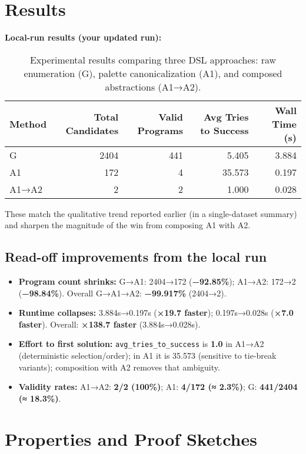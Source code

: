 \documentclass[11pt]{article}
\newcommand{\code}[1]{\texttt{#1}}
\begin{document}
\section{Results}

\textbf{Local-run results (your updated run):}

\begin{table}[h]
\centering
\begin{tabular}{@{}lrrrr@{}}
\toprule
\textbf{Method} & \textbf{Total Candidates} & \textbf{Valid Programs} & \textbf{Avg Tries to Success} & \textbf{Wall Time (s)} \\
\midrule
G & 2404 & 441 & 5.405 & 3.884 \\
A1 & 172 & 4 & 35.573 & 0.197 \\
A1→A2 & 2 & 2 & 1.000 & 0.028 \\
\bottomrule
\end{tabular}
\caption{Experimental results comparing three DSL approaches: raw enumeration (G), palette canonicalization (A1), and composed abstractions (A1→A2).}
\label{tab:results}
\end{table}

These match the qualitative trend reported earlier (in a single-dataset summary) and sharpen the magnitude of the win from composing A1 with A2.

\subsection{Read-off improvements from the local run}

\begin{itemize}
\item \textbf{Program count shrinks:} G→A1: 2404→172 (\textbf{−92.85\%}); A1→A2: 172→2 (\textbf{−98.84\%}). Overall G→A1→A2: \textbf{−99.917\%} (2404→2).
\item \textbf{Runtime collapses:} 3.884s→0.197s (\textbf{×19.7 faster}); 0.197s→0.028s (\textbf{×7.0 faster}). Overall: \textbf{×138.7 faster} (3.884s→0.028s).
\item \textbf{Effort to first solution:} \code{avg\_tries\_to\_success} is \textbf{1.0} in A1→A2 (deterministic selection/order); in A1 it is 35.573 (sensitive to tie-break variants); composition with A2 removes that ambiguity.
\item \textbf{Validity rates:} A1→A2: \textbf{2/2 (100\%)}; A1: \textbf{4/172 (≈ 2.3\%)}; G: \textbf{441/2404 (≈ 18.3\%)}.
\end{itemize}

\section{Properties and Proof Sketches}
\end{document}
